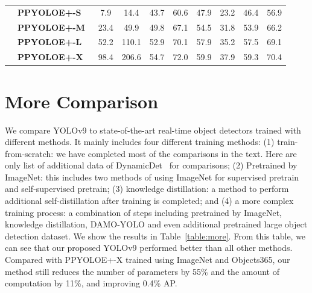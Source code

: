 \documentclass[10pt,twocolumn,letterpaper]{article}
\begin{document}
\begin{table}[h]
\begin{threeparttable}[t]
\begin{tabular}{l|lcccccccc}
				& \textbf{PPYOLOE+-S~\cite{xu2022pp}} & 7.9 & 14.4 & 43.7 & 60.6 & 47.9 & 23.2 & 46.4 & 56.9 \\
				& \textbf{PPYOLOE+-M~\cite{xu2022pp}} & 23.4 & 49.9 & 49.8 & 67.1 & 54.5 & 31.8 & 53.9 & 66.2 \\
				& \textbf{PPYOLOE+-L~\cite{xu2022pp}} & 52.2 & 110.1 & 52.9 & 70.1 & 57.9 & 35.2 & 57.5 & 69.1 \\
				& \textbf{PPYOLOE+-X~\cite{xu2022pp}} & 98.4 & 206.6 & 54.7 & 72.0 & 59.9 & 37.9 & 59.3 & 70.4 \\
				\bottomrule
			\end{tabular}
		\end{threeparttable}
		\vspace{-4pt}
	\end{table}
	
	\newpage
	
	\section{More Comparison}
	
	\vspace{-8pt}
	
	We compare YOLOv9 to state-of-the-art real-time object detectors trained with different methods.  It mainly includes four different training methods: (1) train-from-scratch: we have completed most of the comparisons in the text.  Here are only list of additional data of DynamicDet~\cite{lin2023dynamicdet} for comparisons; (2) Pretrained by ImageNet: this includes two methods of using ImageNet for supervised pretrain and self-supervised pretrain; (3) knowledge distillation: a method to perform additional self-distillation after training is completed; and (4) a more complex training process: a combination of steps including pretrained by ImageNet, knowledge distillation, DAMO-YOLO and even additional pretrained large object detection dataset.  We show the results in Table~\ref{table:more}.  From this table, we can see that our proposed YOLOv9 performed better than all other methods.  Compared with PPYOLOE+-X trained using ImageNet and Objects365, our method still reduces the number of parameters by 55\% and the amount of computation by 11\%, and improving 0.4\% AP.
	
\end{document}
